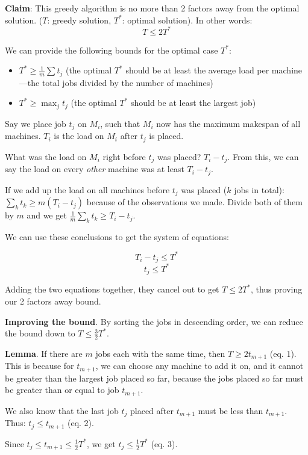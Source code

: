\documentclass{article}
\begin{document}
\textbf{Claim}: This greedy algorithm is no more than 2 factors away from the optimal solution. ($T$: greedy solution, $T^*$: optimal solution). In other words: $$T \leq 2T^*$$

We can provide the following bounds for the optimal case $T^*$:

\begin{itemize}
    \item $T^* \geq \frac{1}{m} \sum t_j$ (the optimal $T^*$ should be at least the average load per machine---the total jobs divided by the number of machines)
    \item $T^* \geq \max_j t_j$ (the optimal $T^*$ should be at least the largest job)
\end{itemize}

Say we place job $t_j$ on $M_i$, such that $M_i$ now has the maximum makespan of all machines. $T_i$ is the load on $M_i$ after $t_j$ is placed.

What was the load on $M_i$ right before $t_j$ was placed? $T_i - t_j$. From this, we can say the load on every \textit{other} machine was at least $T_i - t_j$.

If we add up the load on all machines before $t_j$ was placed ($k$ jobs in total): $\sum_k t_k \geq m(T_i - t_j)$ because of the observations we made. Divide both of them by $m$ and we get $\frac{1}{m} \sum_k t_k \geq T_i - t_j$.

We can use these conclusions to get the system of equations:

$$T_i - t_j \leq T^*$$
$$t_j \leq T^*$$

Adding the two equations together, they cancel out to get $T \leq 2T^*$, thus proving our 2 factors away bound.

\textbf{Improving the bound}. By sorting the jobs in descending order, we can reduce the bound down to $T \leq \frac{3}{2}T^*$.

\textbf{Lemma}. If there are $m$ jobs each with the same time, then $T \geq 2 t_{m + 1}$ (eq. 1). This is because for $t_{m + 1}$, we can choose any machine to add it on, and it cannot be greater than the largest job placed so far, because the jobs placed so far must be greater than or equal to job $t_{m + 1}$.

We also know that the last job $t_j$ placed after $t_{m + 1}$ must be less than $t_{m + 1}$. Thus: $t_j \leq t_{m + 1}$ (eq. 2).

Since $t_j \leq t_{m + 1} \leq \frac{1}{2} T^*$, we get $t_j \leq \frac{1}{2} T^*$ (eq. 3).
\end{document}
